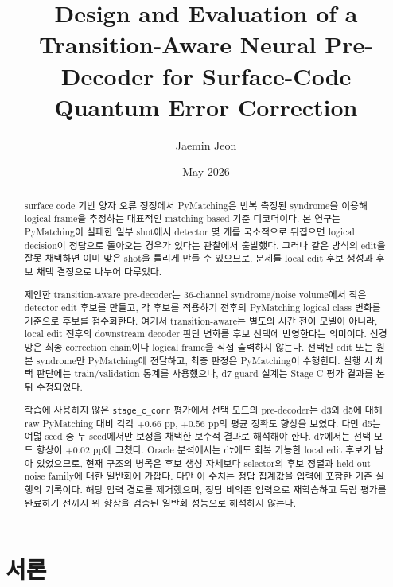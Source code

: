 \documentclass[aps,prd,12pt,twocolumn,superscriptaddress,floatfix,longbibliography]{revtex4-2}
\begin{document}
\title{Design and Evaluation of a Transition-Aware Neural Pre-Decoder for Surface-Code Quantum Error Correction}
\author{Jaemin Jeon}
\date{May 2026}

\begin{abstract}
surface code 기반 양자 오류 정정에서 PyMatching은 반복 측정된 syndrome을 이용해
logical frame을 추정하는 대표적인 matching-based 기준 디코더이다. 본 연구는
PyMatching이 실패한 일부 shot에서
detector 몇 개를 국소적으로 뒤집으면 logical decision이 정답으로 돌아오는 경우가
있다는 관찰에서 출발했다. 그러나 같은 방식의 edit을 잘못 채택하면 이미 맞은 shot을
틀리게 만들 수 있으므로, 문제를 local edit 후보 생성과 후보 채택 결정으로 나누어
다루었다.

제안한 transition-aware pre-decoder는 36-channel syndrome/noise volume에서 작은
detector edit 후보를 만들고, 각 후보를 적용하기 전후의 PyMatching logical class
변화를 기준으로 후보를 점수화한다. 여기서 transition-aware는 별도의 시간 전이
모델이 아니라, local edit 전후의 downstream decoder 판단 변화를 후보 선택에
반영한다는 의미이다. 신경망은 최종 correction chain이나 logical frame을 직접
출력하지 않는다.
선택된 edit 또는 원본 syndrome만 PyMatching에 전달하고, 최종 판정은 PyMatching이
수행한다. 실행 시 채택 판단에는 train/validation 통계를 사용했으나,
d7 guard 설계는 Stage C 평가 결과를 본 뒤 수정되었다.

학습에 사용하지 않은 \texttt{stage\_c\_corr} 평가에서 선택 모드의 pre-decoder는
d3와 d5에 대해 raw PyMatching 대비 각각 \(+0.66\) pp, \(+0.56\) pp의 평균 정확도
향상을 보였다. 다만 d5는 여덟 seed 중 두 seed에서만 보정을 채택한 보수적 결과로
해석해야 한다. d7에서는 선택 모드 향상이 \(+0.02\) pp에 그쳤다. Oracle 분석에서는
d7에도 회복 가능한 local edit 후보가 남아 있었으므로, 현재 구조의 병목은 후보 생성
자체보다 selector의 후보 정렬과 held-out noise family에 대한 일반화에 가깝다.
다만 이 수치는 정답 집계값을 입력에 포함한 기존 실행의 기록이다.
해당 입력 경로를 제거했으며, 정답 비의존 입력으로 재학습하고 독립 평가를
완료하기 전까지 위 향상을 검증된 일반화 성능으로 해석하지 않는다.
\end{abstract}

\maketitle

\section{서론}
\end{document}
